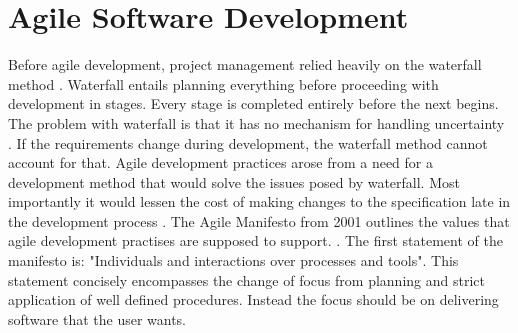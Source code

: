 \section{Agile Software Development}
Before agile development, project management relied heavily on the waterfall method \cite{sommerville}. Waterfall entails planning everything before proceeding with development in stages. Every stage is completed entirely before the next begins. The problem with waterfall is that it has no mechanism for handling uncertainty \cite{sommerville}. If the requirements change during development, the waterfall method cannot account for that. Agile development practices arose from a need for a development method that would solve the issues posed by waterfall. Most importantly it would lessen the cost of making changes to the specification late in the development process \cite{alancline}. The Agile Manifesto from 2001 outlines the values that agile development practises are supposed to support. \cite{beck2001agile}. The first statement of the manifesto is: "Individuals and interactions over processes and tools"\cite{beck2001agile}. This statement concisely encompasses the change of focus from planning and strict application of well defined procedures. Instead the focus should be on delivering software that the user wants.
